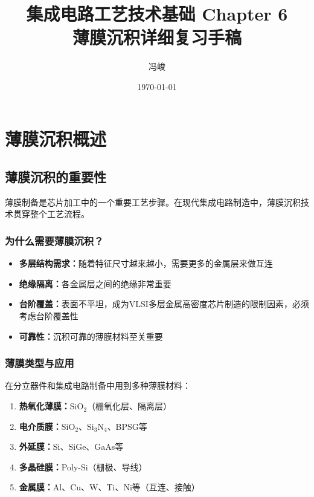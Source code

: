 \documentclass[UTF8,12pt,a4paper]{ctexart}
\title{集成电路工艺技术基础 Chapter 6\\薄膜沉积详细复习手稿}
\author{冯峻}
\date{\today}
\begin{document}
\fancyfoot[C]{\thepage}

\maketitle
\tableofcontents
\newpage  %


\section{薄膜沉积概述}

\subsection{薄膜沉积的重要性}

薄膜制备是芯片加工中的一个重要工艺步骤。在现代集成电路制造中，薄膜沉积技术贯穿整个工艺流程。

\subsubsection{为什么需要薄膜沉积？}

\begin{itemize}
    \item \textbf{多层结构需求：}随着特征尺寸越来越小，需要更多的金属层来做互连
    \item \textbf{绝缘隔离：}各金属层之间的绝缘非常重要
    \item \textbf{台阶覆盖：}表面不平坦，成为VLSI多层金属高密度芯片制造的限制因素，必须考虑台阶覆盖性
    \item \textbf{可靠性：}沉积可靠的薄膜材料至关重要
\end{itemize}

\subsubsection{薄膜类型与应用}

在分立器件和集成电路制备中用到多种薄膜材料：

\begin{enumerate}
    \item \textbf{热氧化薄膜：}SiO$_2$（栅氧化层、隔离层）
    \item \textbf{电介质膜：}SiO$_2$、Si$_3$N$_4$、BPSG等
    \item \textbf{外延膜：}Si、SiGe、GaAs等
    \item \textbf{多晶硅膜：}Poly-Si（栅极、导线）
    \item \textbf{金属膜：}Al、Cu、W、Ti、Ni等（互连、接触）
\end{enumerate}
\end{document}
